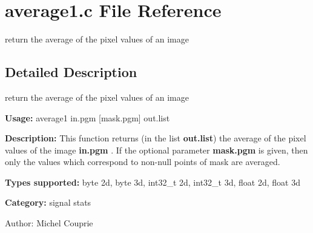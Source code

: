 \section{average1.c File Reference}
\label{average1_8c}
return the average of the pixel values of an image 



\subsection{Detailed Description}
return the average of the pixel values of an image 

{\bf Usage:} average1 in.pgm [mask.pgm] out.list

{\bf Description:} This function returns (in the list {\bf out.list}) the average of the pixel values of the image {\bf in.pgm} . If the optional parameter {\bf mask.pgm} is given, then only the values which correspond to non-null points of mask are averaged.

{\bf Types supported:} byte 2d, byte 3d, int32\_\-t 2d, int32\_\-t 3d, float 2d, float 3d

{\bf Category:} signal stats

\begin{Desc}
\item[Author:]Michel Couprie \end{Desc}
